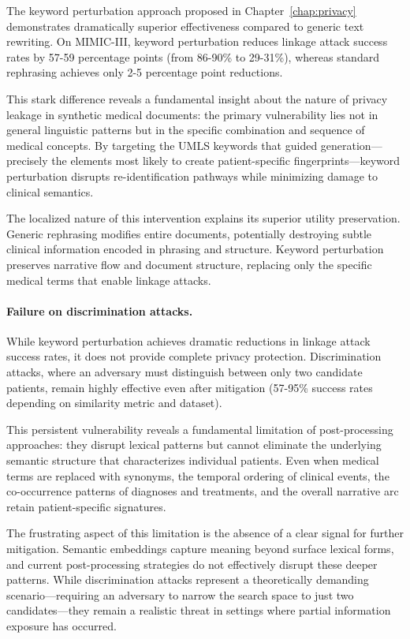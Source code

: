 The keyword perturbation approach proposed in Chapter~\ref{chap:privacy} demonstrates dramatically superior effectiveness compared to generic text rewriting.
On MIMIC-III, keyword perturbation reduces linkage attack success rates by 57-59 percentage points (from 86-90\% to 29-31\%), whereas standard rephrasing achieves only 2-5 percentage point reductions.

This stark difference reveals a fundamental insight about the nature of privacy leakage in synthetic medical documents: the primary vulnerability lies not in general linguistic patterns but in the specific combination and sequence of medical concepts.
By targeting the UMLS keywords that guided generation—precisely the elements most likely to create patient-specific fingerprints—keyword perturbation disrupts re-identification pathways while minimizing damage to clinical semantics.

The localized nature of this intervention explains its superior utility preservation.
Generic rephrasing modifies entire documents, potentially destroying subtle clinical information encoded in phrasing and structure.
Keyword perturbation preserves narrative flow and document structure, replacing only the specific medical terms that enable linkage attacks.

\paragraph{Failure on discrimination attacks.}

While keyword perturbation achieves dramatic reductions in linkage attack success rates, it does not provide complete privacy protection.
Discrimination attacks, where an adversary must distinguish between only two candidate patients, remain highly effective even after mitigation (57-95\% success rates depending on similarity metric and dataset).

This persistent vulnerability reveals a fundamental limitation of post-processing approaches: they disrupt lexical patterns but cannot eliminate the underlying semantic structure that characterizes individual patients.
Even when medical terms are replaced with synonyms, the temporal ordering of clinical events, the co-occurrence patterns of diagnoses and treatments, and the overall narrative arc retain patient-specific signatures.

The frustrating aspect of this limitation is the absence of a clear signal for further mitigation.
Semantic embeddings capture meaning beyond surface lexical forms, and current post-processing strategies do not effectively disrupt these deeper patterns.
While discrimination attacks represent a theoretically demanding scenario—requiring an adversary to narrow the search space to just two candidates—they remain a realistic threat in settings where partial information exposure has occurred.

